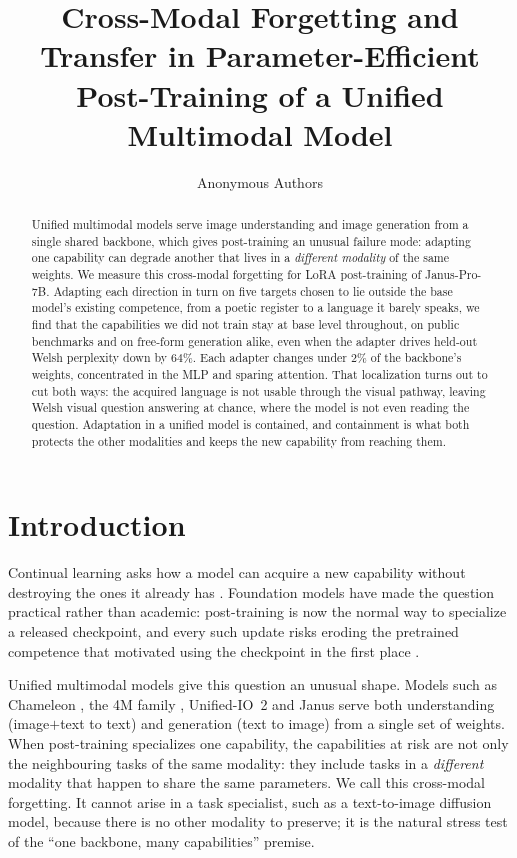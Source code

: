 \documentclass{article}
\title{Cross-Modal Forgetting and Transfer in Parameter-Efficient\\
Post-Training of a Unified Multimodal Model}
\author{%
  Anonymous Authors \\
}
\begin{document}
\maketitle

\begin{abstract}
Unified multimodal models serve image understanding and image generation from a
single shared backbone, which gives post-training an unusual failure mode:
adapting one capability can degrade another that lives in a \emph{different
modality} of the same weights. We measure this cross-modal forgetting for LoRA
post-training of Janus-Pro-7B. Adapting each direction in turn on five targets
chosen to lie outside the base model's existing competence, from a poetic
register to a language it barely speaks, we find that the capabilities we did not
train stay at base level throughout, on public benchmarks and on free-form
generation alike, even when the adapter drives held-out Welsh perplexity down by
$64\%$. Each adapter changes under $2\%$ of the backbone's weights, concentrated
in the MLP and sparing attention. That localization turns out to cut both ways:
the acquired language is not usable through the visual pathway, leaving Welsh
visual question answering at chance, where the model is not even reading the
question. Adaptation in a unified model is contained, and containment is what
both protects the other modalities and keeps the new capability from reaching
them.
\end{abstract}

\section{Introduction}
Continual learning asks how a model can acquire a new capability without
destroying the ones it already has \citep{mccloskey1989catastrophic,
french1999catastrophic}. Foundation models have made the question practical
rather than academic: post-training is now the normal way to specialize a
released checkpoint, and every such update risks eroding the pretrained
competence that motivated using the checkpoint in the first place
\citep{kirkpatrick2017ewc, li2017lwf}.

Unified multimodal models give this question an unusual shape. Models such as
Chameleon \citep{chameleon2024}, the 4M family \citep{bachmann20244m21},
Unified-IO~2 \citep{lu2024unifiedio2} and Janus \citep{wu2024janus, januspro}
serve both understanding (image$+$text to text) and generation (text to image)
from a single set of weights. When post-training specializes one capability, the
capabilities at risk are not only the neighbouring tasks of the same modality:
they include tasks in a \emph{different} modality that happen to share the same
parameters. We call this cross-modal forgetting. It cannot arise in a task
specialist, such as a text-to-image diffusion model, because there is no other
modality to preserve; it is the natural stress test of the ``one backbone, many
capabilities'' premise.
\end{document}
